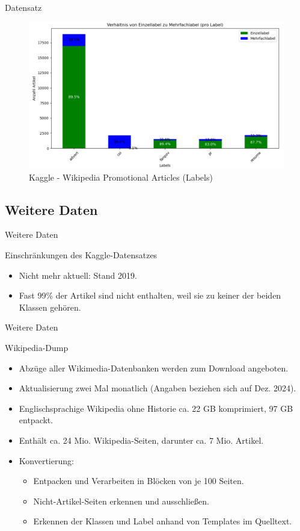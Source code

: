 \documentclass[aspectratio=169]{beamer} %
\begin{document}
\begin{frame}{Datensatz}
    \begin{figure}
        \centering
        \includegraphics[width=0.6\linewidth]{figures/kaggle-promo-labels-2.png}
        \caption{Kaggle - Wikipedia Promotional Articles (Labels)}
    \end{figure}
\end{frame}

\subsection{Weitere Daten}

\begin{frame}{Weitere Daten}
    \begin{block}{Einschränkungen des Kaggle-Datensatzes}
        \begin{itemize}
            \item Nicht mehr aktuell: Stand 2019.
            \item Fast 99\% der Artikel sind nicht enthalten, weil sie zu keiner der beiden Klassen gehören.
        \end{itemize}
    \end{block}
\end{frame}

\begin{frame}{Weitere Daten}
    \begin{block}{Wikipedia-Dump}
        \begin{itemize}
            \item Abzüge aller Wikimedia-Datenbanken werden zum Download angeboten.
            \item Aktualisierung zwei Mal monatlich (Angaben beziehen sich auf Dez. 2024).
            \item Englischsprachige Wikipedia ohne Historie ca. 22 GB komprimiert, 97 GB entpackt.
            \item Enthält ca. 24 Mio. Wikipedia-Seiten, darunter ca. 7 Mio. Artikel.
            \item Konvertierung:
                  \begin{itemize}
                      \item Entpacken und Verarbeiten in Blöcken von je 100 Seiten.
                      \item Nicht-Artikel-Seiten erkennen und ausschließen.
                      \item Erkennen der Klassen und Label anhand von Templates im Quelltext.
                  \end{itemize}
        \end{itemize}
    \end{block}
\end{frame}
\end{document}
